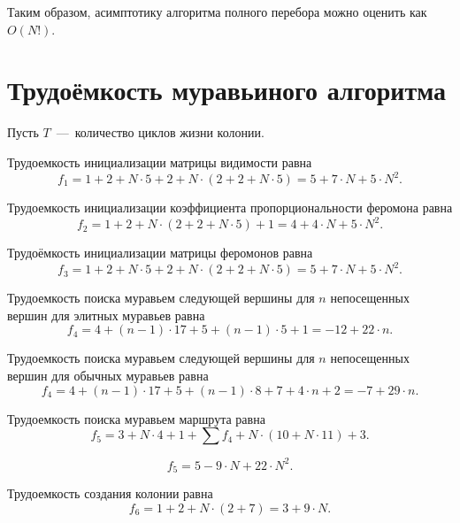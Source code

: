 Таким образом, асимптотику алгоритма полного перебора можно оценить как $O(N!)$.

\section{Трудоёмкость муравьиного алгоритма}
Пусть $T$~---~количество циклов жизни колонии.

Трудоемкость инициализации матрицы видимости равна
\begin{equation}
	f_1 = 1 + 2 + N \cdot 5 + 2 + N \cdot (2 + 2 + N \cdot 5) = 5 + 7 \cdot N + 5 \cdot N^2.
\end{equation}

Трудоемкость инициализации коэффициента пропорциональности феромона равна
\begin{equation}
	f_2 = 1 + 2 + N \cdot (2 + 2 + N \cdot 5) + 1 = 4 + 4 \cdot N + 5 \cdot N^2.
\end{equation}

Трудоёмкость инициализации матрицы феромонов равна
\begin{equation}
	f_3 = 1 + 2 + N \cdot 5 + 2 + N \cdot (2 + 2 + N \cdot 5) = 5 + 7 \cdot N + 5 \cdot N^2.
\end{equation}

Трудоемкость поиска муравьем следующей вершины для $n$ непосещенных вершин для элитных муравьев равна
\begin{equation}
	f_4 = 4 + (n - 1) \cdot 17 + 5 + (n - 1) \cdot 5 + 1 = -12 + 22 \cdot n.
\end{equation}

Трудоемкость поиска муравьем следующей вершины для $n$ непосещенных вершин для обычных муравьев равна
\begin{equation}
	f_4 = 4 + (n - 1) \cdot 17 + 5 + (n - 1) \cdot 8 + 7 + 4 \cdot n + 2 = -7 + 29 \cdot n.
\end{equation}

Трудоемкость поиска муравьем маршрута равна
\begin{equation}
	f_5 = 3 + N \cdot 4 + 1 + \sum{f_4} + N \cdot (10 + N \cdot 11) + 3.
\end{equation}

\begin{equation}
	f_5 = 5 - 9 \cdot N + 22 \cdot N^2.
\end{equation}

Трудоемкость создания колонии равна
\begin{equation}
	f_6 = 1 + 2 + N \cdot (2 + 7) = 3 + 9 \cdot N.
\end{equation}

